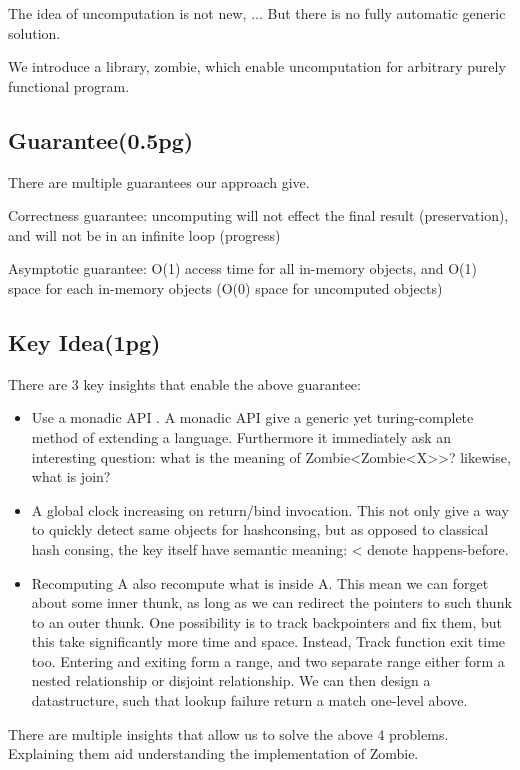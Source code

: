 The idea of uncomputation is not new, ... But there is no fully automatic generic solution.

We introduce a library, zombie, which enable uncomputation for arbitrary purely functional program.
\subsection{Guarantee(0.5pg)}
There are multiple guarantees our approach give.

Correctness guarantee: uncomputing will not effect the final result (preservation), and will not be in an infinite loop (progress)

Asymptotic guarantee: O(1) access time for all in-memory objects, and O(1) space for each in-memory objects (O(0) space for uncomputed objects)
\subsection{Key Idea(1pg)}
There are 3 key insights that enable the above guarantee:
\begin{itemize}
	\item Use a monadic API . A monadic API give a generic yet turing-complete  method of extending a language. Furthermore it immediately ask an interesting question: what is the meaning of Zombie<Zombie<X>>? likewise, what is join?
	\item A global clock increasing on return/bind invocation. This not only give a way to quickly detect same objects for hashconsing, but as opposed to classical hash consing, the key itself have semantic meaning: < denote happens-before.
	\item Recomputing A also recompute what is inside A. This mean we can forget about some inner thunk, as long as we can redirect the pointers to such thunk to an outer thunk. One possibility is to track backpointers and fix them, but this take significantly more time and space. Instead, Track function exit time too. Entering and exiting form a range, and two separate range either form a nested relationship or disjoint relationship. We can then design a datastructure, such that lookup failure return a match one-level above.
\end{itemize}


There are multiple insights that allow us to solve the above 4 problems. Explaining them aid understanding the implementation of Zombie.

